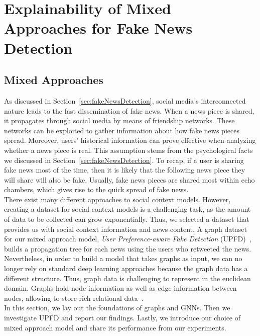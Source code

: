 
\chapter{Explainability of Mixed Approaches for Fake News Detection}\label{chapter:MixedApproachesForFND}

\section{Mixed Approaches}
\label{sec:mixedApproaches}
As discussed in Section~\ref{sec:fakeNewsDetection}, social media's interconnected nature leads to the fast dissemination of
fake news. When a news piece is shared, it propagates through social media by means of friendship networks. These networks
can be exploited to gather information about how fake news pieces spread. Moreover, users' historical information can prove effective when analyzing whether a news piece is real. This assumption stems from the psychological facts we discussed in Section~\ref{sec:fakeNewsDetection}. To recap, if a user is sharing fake news most of the time, then it is likely that the following news piece they will share will also be fake. Usually, fake news pieces are shared most within echo chambers, which gives rise to the quick spread of fake news.\\
There exist many different approaches to social context models. However, creating a dataset for social context models is a challenging task, as the amount of data to be collected can grow exponentially. Thus, we selected a dataset that provides us with social context information and news content. A graph dataset for our mixed approach model, \emph{User Preference-aware Fake Detection} (UPFD)~\parencite{UPFD_Dataset_Shu}, builds a propagation tree for each news using the users who retweeted the news. Nevertheless, in order to build a model that takes graphs as input, we can no longer rely on standard deep learning approaches because the graph data has a different structure. Thus, graph data is challenging to represent in the euclidean domain. Graphs hold node information as well as edge information between nodes, allowing to store rich relational data~\parencite{DeepLearningOnGraphs_Zhang}.\\
In this section, we lay out the foundations of graphs and GNNs. Then we investigate UPFD and report our findings. Lastly, we introduce our choice of mixed approach model and share its performance from our experiments.

